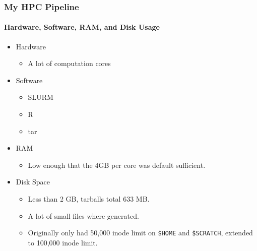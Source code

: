 \documentclass[10pt]{beamer}
\begin{document}
\begin{frame}
  \frametitle{My HPC Pipeline}
  \framesubtitle{Hardware, Software, RAM, and Disk Usage}
  \begin{itemize}
    \item Hardware
      \begin{itemize}
        \item A lot of computation cores
      \end{itemize}

    \item Software
      \begin{itemize}
        \item SLURM
        \item R
        \item tar
      \end{itemize}

    \item RAM
      \begin{itemize}
        \item Low enough that the 4GB per core was default sufficient.
      \end{itemize}

    \item Disk Space
      \begin{itemize}
        \item Less than 2 GB, tarballs total 633 MB.
        \item A lot of small files where generated.
        \item Originally only had 50,000 inode limit on {\tt \$HOME} and
          {\tt \$SCRATCH}, extended to 100,000 inode limit.
      \end{itemize}
  \end{itemize} 
\end{frame}
\end{document}
